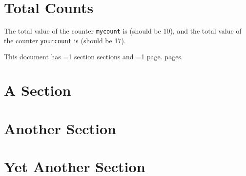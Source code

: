 \documentclass{article}
\newcounter{mycount} %
\begin{document}

\section{Total Counts}
\addtocounter{mycount}{5}
\addtocounter{yourcount}{5}
The total value of the counter {\tt mycount} is  (should
be 10), and the total value of the counter {\tt yourcount} is
 (should be 17).

This document has 
\ifnum{}=1 section \else sections \fi
and 
\ifnum{}=1 page. \else pages. \fi

\addtocounter{yourcount}{5}
\addtocounter{mycount}{5}
\addtocounter{yourcount}{7}

\section{A Section}
\section{Another Section}
\section{Yet Another Section}
\end{document}
